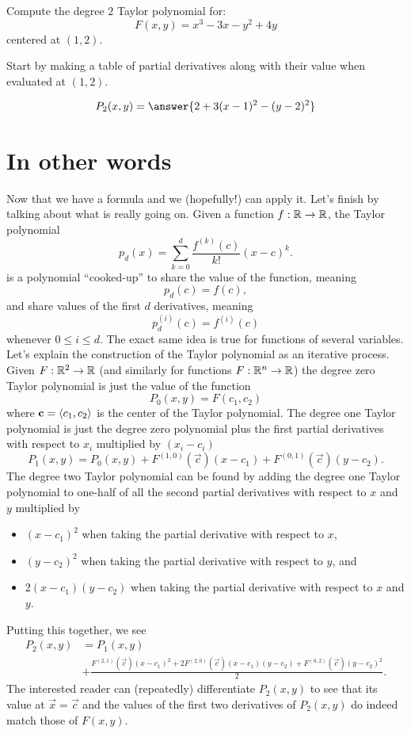 \documentclass{ximera}
\begin{document}
\begin{question}
  Compute the degree $2$ Taylor polynomial for:
  \[
  F(x,y)= x^3-3x-y^2+4y
  \]
  centered at $(1,2)$.
  \begin{hint}
    Start by making a table of partial derivatives along with
    their value when evaluated at $(1,2)$.
  \end{hint}
  \begin{prompt}
    \[
    P_2(x,y) = \answer{2 + 3(x-1)^2 -(y-2)^2}
    \]
  \end{prompt}
\end{question}

\section{In other words}

Now that we have a formula and we (hopefully!) can apply it. Let's
finish by talking about what is really going on. Given a function
$f:\mathbb R\to\mathbb R$, the Taylor polynomial 
\[
p_d(x) = \sum_{k=0}^d\frac{f^{(k)}(c)}{k!}(x-c)^k.
\]
is a polynomial ``cooked-up'' to share the value of the function,
meaning
\[
p_d(c)=f(c),
\]
and share values of the first $d$ derivatives, meaning
\[
p_d^{(i)}(c) = f^{(i)}(c) 
\]
whenever $0\le i\le d$. The exact same idea is true for functions of
several variables. Let's explain the construction of the Taylor polynomial as an iterative process. Given $F:\mathbb R^2\to\mathbb R$ (and similarly for functions
$F:\mathbb R^n\to\mathbb R$) the degree zero Taylor polynomial is just the value of
the function
\[
P_0(x,y) = F(c_1,c_2)
\]
where $\mathbf{c}=\left\langle c_1,c_2\right\rangle$ is the center of the Taylor
polynomial.  The degree one Taylor polynomial is just the degree zero
polynomial plus the first partial derivatives with respect to $x_i$
multiplied by $(x_i-c_i)$
\[
P_1(x,y) = P_0(x,y) + F^{(1,0)}(\vec{c})(x-c_1) + F^{(0,1)}(\vec{c})(y-c_2).
\]
The degree two Taylor polynomial can be found by adding the degree one
Taylor polynomial to one-half of all the second partial derivatives
with respect to $x$ and $y$ multiplied by
\begin{itemize}
\item $(x-c_1)^2$ when taking the partial derivative with respect to
  $x$,
\item $(y-c_2)^2$ when taking the partial derivative with respect to
  $y$, and
\item $2(x-c_1)(y-c_2)$ when taking the partial derivative with respect
  to $x$ and $y$.
\end{itemize}
Putting this together, we see
\begin{align*}
P_2(x,y) &= P_1(x,y) \\
&+\frac{F^{(2,1)}(\vec{c})(x-c_1)^2 +
2F^{(2,0)}(\vec{c})(x-c_1)(y-c_2)+F^{(0,2)}(\vec{c})(y-c_2)^2}{2}.
\end{align*}
The interested reader can (repeatedly) differentiate $P_2(x,y)$ to see
that its value at $\vec{x}=\vec{c}$ and the values of the first two
derivatives of $P_2(x,y)$ do indeed match those of $F(x,y)$.
\end{document}
